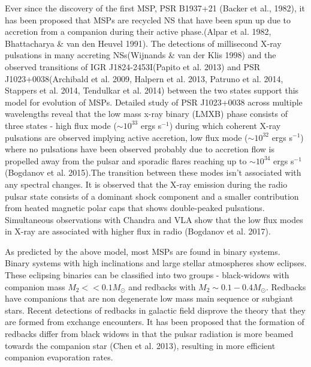 \documentclass[a4paper,fleqn,usenatbib]{mnras}
\begin{document}
Ever since the discovery of the first MSP, PSR B1937+21 (Backer et al., 1982), it has been proposed that MSPs are recycled NS that have been spun up due to accretion from a companion during their active phase.(Alpar et al. 1982, Bhattacharya \& van den Heuvel 1991). The detections of millisecond X-ray pulsations in many accreting NSs(Wijnands \& van der Klis 1998) and the observed transitions of IGR J1824-2453I(Papito et al. 2013)  and PSR J1023+0038(Archibald et al. 2009, Halpern et al. 2013, Patruno et al. 2014, Stappers et al. 2014, Tendulkar et al. 2014) between the two states  support this model for evolution of MSPs. Detailed study of PSR J1023+0038 across multiple wavelengths reveal that the low mass x-ray binary (LMXB) phase consists of three states - high flux mode ($\sim 10^{33}$ ergs s$^{-1}$) during which coherent X-ray pulsations are observed implying active accretion, low flux mode ($\sim 10^{32}$ ergs s$^{-1}$) where no pulsations have been observed probably due to accretion flow is propelled away from the pulsar and sporadic flares reaching up to $\sim 10^{34}$ ergs s$^{-1}$ (Bogdanov et al. 2015).The transition between these modes isn't associated with any spectral changes. It is observed that the X-ray emission during the radio pulsar state consists of a dominant shock component and a smaller contribution from heated magnetic polar caps that shows double-peaked pulsations. Simultaneous observations with Chandra and VLA show that the low flux modes in X-ray are associated with higher flux in radio (Bogdanov et al. 2017).

As predicted by the above model, most MSPs are found in binary systems. Binary systems with high inclinations and large stellar atmospheres show eclipses. These eclipsing binaries can be classified into two groups - black-widows with companion mass $M_2 << 0.1M_{\odot}$ and redbacks with $M_2 \sim 0.1 - 0.4M_{\odot}$. Redbacks have companions that are non degenerate low mass main sequence or subgiant stars. Recent detections of redbacks in galactic field disprove the theory that they are formed from exchange encounters. It has been proposed that the formation of redbacks differ from black widows in that the pulsar radiation is more beamed towards the companion star (Chen et al. 2013), resulting in more efficient companion evaporation rates. 
\end{document}
